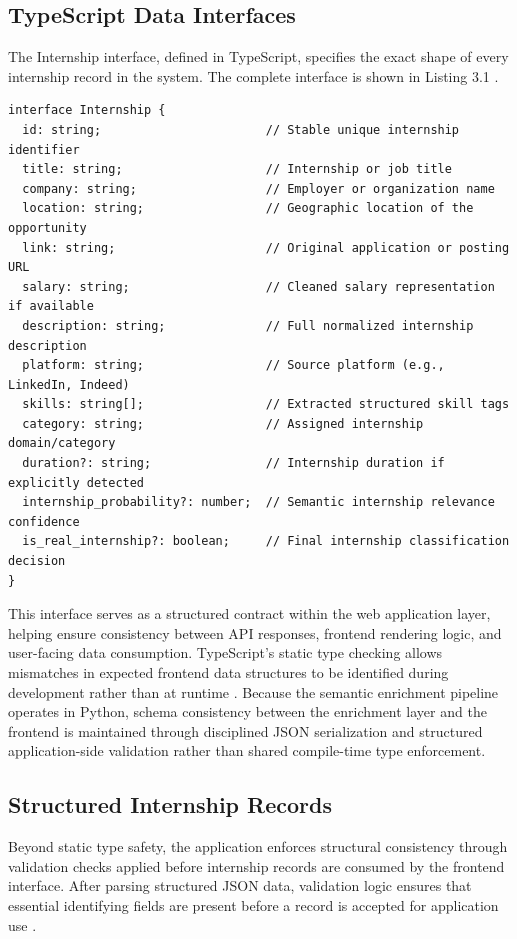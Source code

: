 \subsection{TypeScript Data Interfaces}
The Internship interface, defined in TypeScript, specifies the exact shape of every internship
record in the system. The complete interface is shown in Listing 3.1 \cite{pierce2002types}.
\begin{verbatim}
interface Internship {
  id: string;                       // Stable unique internship identifier
  title: string;                    // Internship or job title
  company: string;                  // Employer or organization name
  location: string;                 // Geographic location of the opportunity
  link: string;                     // Original application or posting URL
  salary: string;                   // Cleaned salary representation if available
  description: string;              // Full normalized internship description
  platform: string;                 // Source platform (e.g., LinkedIn, Indeed)
  skills: string[];                 // Extracted structured skill tags
  category: string;                 // Assigned internship domain/category
  duration?: string;                // Internship duration if explicitly detected
  internship_probability?: number;  // Semantic internship relevance confidence
  is_real_internship?: boolean;     // Final internship classification decision
}
\end{verbatim}
This interface serves as a structured contract within the web application layer, helping ensure consistency between API responses, frontend rendering logic, and user-facing data consumption. TypeScript's static type checking allows mismatches in expected frontend data structures to be identified during development rather than at runtime \cite{pierce2002types}.
Because the semantic enrichment pipeline operates in Python, schema consistency between the enrichment layer and the frontend is maintained through disciplined JSON serialization and structured application-side validation rather than shared compile-time type enforcement.
\subsection{Structured Internship Records}
Beyond static type safety, the application enforces structural consistency through validation checks applied before internship records are consumed by the frontend interface. After parsing structured JSON data, validation logic ensures that essential identifying fields are present before a record is accepted for application use \cite{batini2009methodologies, doan2012principles}.
